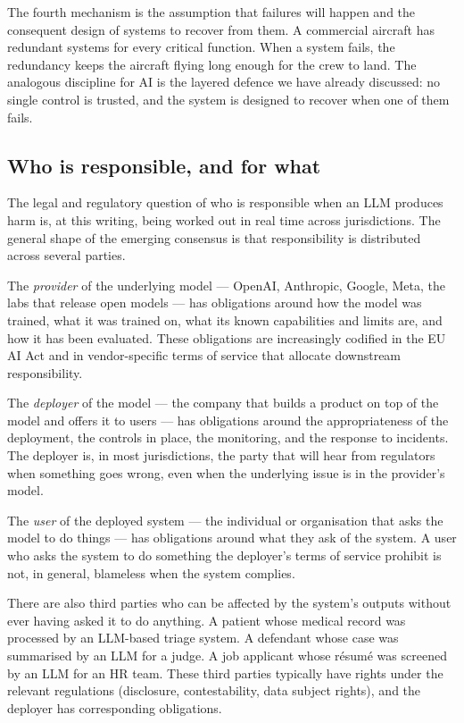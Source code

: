 The fourth mechanism is the assumption that failures will
happen and the consequent design of systems to recover from
them. A commercial aircraft has redundant systems for every
critical function. When a system fails, the redundancy keeps
the aircraft flying long enough for the crew to land. The
analogous discipline for AI is the layered defence we have
already discussed: no single control is trusted, and the
system is designed to recover when one of them fails.

\subsection*{Who is responsible, and for what}

The legal and regulatory question of who is responsible when
an LLM produces harm is, at this writing, being worked out in
real time across jurisdictions. The general shape of the
emerging consensus is that responsibility is distributed
across several parties.

The \emph{provider} of the underlying model --- OpenAI,
Anthropic, Google, Meta, the labs that release open models ---
has obligations around how the model was trained, what it was
trained on, what its known capabilities and limits are, and
how it has been evaluated. These obligations are increasingly
codified in the EU AI Act and in vendor-specific terms of
service that allocate downstream responsibility.

The \emph{deployer} of the model --- the company that builds
a product on top of the model and offers it to users --- has
obligations around the appropriateness of the deployment, the
controls in place, the monitoring, and the response to
incidents. The deployer is, in most jurisdictions, the party
that will hear from regulators when something goes wrong,
even when the underlying issue is in the provider's model.

The \emph{user} of the deployed system --- the individual or
organisation that asks the model to do things --- has
obligations around what they ask of the system. A user who
asks the system to do something the deployer's terms of
service prohibit is not, in general, blameless when the
system complies.

There are also third parties who can be affected by the
system's outputs without ever having asked it to do anything.
A patient whose medical record was processed by an LLM-based
triage system. A defendant whose case was summarised by an
LLM for a judge. A job applicant whose r\'esum\'e was
screened by an LLM for an HR team. These third parties
typically have rights under the relevant regulations
(disclosure, contestability, data subject rights), and the
deployer has corresponding obligations.


